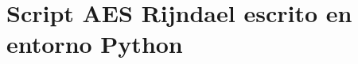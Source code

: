 \documentclass[../main/main.tex]{subfiles}
\begin{document}
\espacio

\tocless\section{Script AES Rijndael escrito en entorno Python}\label{anexo:script_aes_original}\hfill

\end{document}
